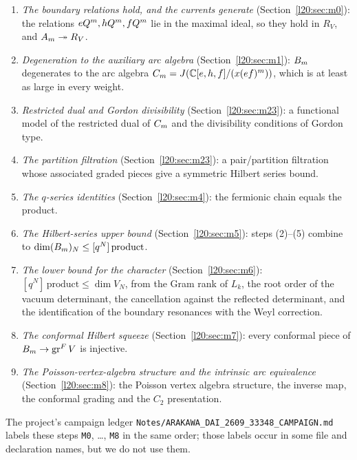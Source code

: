 \begin{enumerate}
\item[(1)] \emph{The boundary relations hold, and the currents generate} (Section~\ref{l20:sec:m0}): the relations
  $eQ^m, hQ^m, fQ^m$ lie in the maximal ideal, so they hold in $R_V$, and
  $A_m\twoheadrightarrow R_V$.
\item[(2)] \emph{Degeneration to the auxiliary arc algebra} (Section~\ref{l20:sec:m1}): $B_m$ degenerates to
  the arc algebra $C_m=J({\mathbb{C}}[e,h,f]/(x(ef)^m))$, which is at least as large in every weight.
\item[(3)] \emph{Restricted dual and Gordon divisibility} (Section~\ref{l20:sec:m23}): a functional model of the
  restricted dual of $C_m$ and the divisibility conditions of Gordon type.
\item[(4)] \emph{The partition filtration} (Section~\ref{l20:sec:m23}): a pair/partition filtration whose
  associated graded pieces give a symmetric Hilbert series bound.
\item[(5)] \emph{The $q$-series identities} (Section~\ref{l20:sec:m4}): the fermionic chain equals the product.
\item[(6)] \emph{The Hilbert-series upper bound} (Section~\ref{l20:sec:m5}): steps (2)--(5) combine to
  $\dim(B_m)_N\le[q^N]\,\text{product}$.
\item[(7)] \emph{The lower bound for the character} (Section~\ref{l20:sec:m6}): $[q^N]\,\text{product}\le\dim V_N$,
  from the Gram rank of $L_k$, the root order of the vacuum determinant, the cancellation against the reflected
  determinant, and the identification of the boundary resonances with the Weyl correction.
\item[(8)] \emph{The conformal Hilbert squeeze} (Section~\ref{l20:sec:m7}): every conformal piece of
  $B_m\to\operatorname{gr}^F V$ is injective.
\item[(9)] \emph{The Poisson-vertex-algebra structure and the intrinsic arc equivalence}
  (Section~\ref{l20:sec:m8}): the Poisson vertex algebra structure, the inverse map, the conformal grading and the
  $C_2$ presentation.
\end{enumerate}
The project's campaign ledger \texttt{Notes/ARAKAWA\_DAI\_2609\_33348\_CAMPAIGN.md} labels these steps
\texttt{M0}, \ldots, \texttt{M8} in the same order; those labels occur in some file and declaration names, but we do
not use them.


